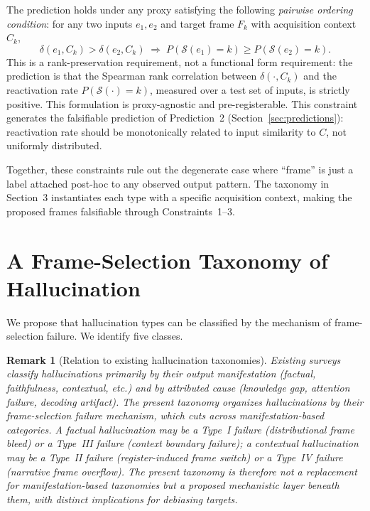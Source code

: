 \documentclass[12pt]{article}
\newtheorem{remark}{Remark}
\begin{document}
The prediction holds under any proxy satisfying the following
\emph{pairwise ordering condition}: for any two inputs $e_1, e_2$
and target frame $F_k$ with acquisition context $C_k$,
\[
\delta(e_1, C_k) > \delta(e_2, C_k)
\;\Rightarrow\;
P(\mathcal{S}(e_1) = k) \geq P(\mathcal{S}(e_2) = k).
\]
This is a rank-preservation requirement, not a functional form
requirement: the prediction is that the Spearman rank correlation
between $\delta(\cdot, C_k)$ and the reactivation rate
$P(\mathcal{S}(\cdot) = k)$, measured over a test set of inputs,
is strictly positive.
This formulation is proxy-agnostic and pre-registerable.
This constraint generates the falsifiable prediction of
Prediction~2 (Section~\ref{sec:predictions}): reactivation rate
should be monotonically related to input similarity to $C$,
not uniformly distributed.

Together, these constraints rule out the degenerate case where
``frame'' is just a label attached post-hoc to any observed output
pattern.
The taxonomy in Section~3 instantiates each type with a specific
acquisition context, making the proposed frames falsifiable through
Constraints~1--3.

\section{A Frame-Selection Taxonomy of Hallucination}

We propose that hallucination types can be classified by the
mechanism of frame-selection failure. We identify five classes.

\begin{remark}[Relation to existing hallucination taxonomies]
Existing surveys \cite{huang2023survey, zhang2023siren} classify
hallucinations primarily by their output manifestation (factual,
faithfulness, contextual, etc.) and by attributed cause (knowledge
gap, attention failure, decoding artifact). The present taxonomy
organizes hallucinations by their \emph{frame-selection failure
mechanism}, which cuts across manifestation-based categories. A
factual hallucination may be a Type~I failure (distributional frame
bleed) or a Type~III failure (context boundary failure); a contextual
hallucination may be a Type~II failure (register-induced frame switch)
or a Type~IV failure (narrative frame overflow). The present taxonomy
is therefore not a replacement for manifestation-based taxonomies
but a proposed mechanistic layer beneath them, with distinct
implications for debiasing targets.
\end{remark}
\end{document}
